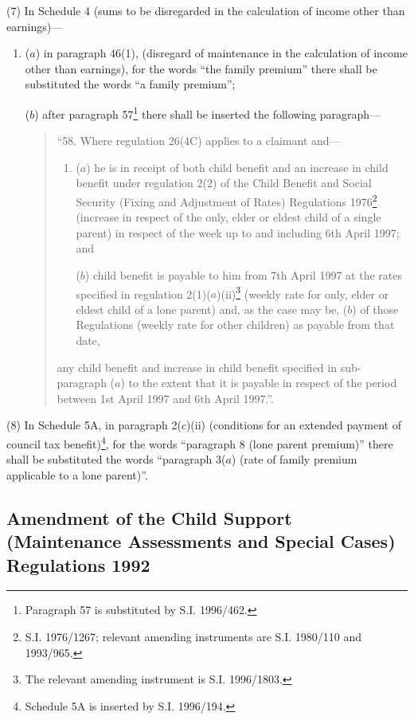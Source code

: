 \documentclass[a4paper]{article}
\begin{document}
(7)  In Schedule 4 (sums to be disregarded in the calculation of income other than earnings)—
\begin{enumerate}\item[]
($a$) in paragraph 46(1), (disregard of maintenance in the calculation of income other than earnings), for the words “the family premium” there shall be substituted the words “a family premium”;

($b$) after paragraph 57\footnote{\frenchspacing Paragraph 57 is substituted by S.I. 1996/462.} there shall be inserted the following paragraph—
\begin{quotation}
“58.  Where regulation 26(4C) applies to a claimant and—
\begin{enumerate}\item[]
($a$) he is in receipt of both child benefit and an increase in child benefit under regulation 2(2) of the Child Benefit and Social Security (Fixing and Adjustment of Rates) Regulations 1976\footnote{\frenchspacing S.I. 1976/1267; relevant amending instruments are S.I. 1980/110 and 1993/965.} (increase in respect of the only, elder or eldest child of a single parent) in respect of the week up to and including 6th April 1997; and

($b$) child benefit is payable to him from 7th April 1997 at the rates specified in regulation 2(1)($a$)(ii)\footnote{\frenchspacing The relevant amending instrument is S.I. 1996/1803.} (weekly rate for only, elder or eldest child of a lone parent) and, as the case may be, ($b$) of those Regulations (weekly rate for other children) as payable from that date,
\end{enumerate}
any child benefit and increase in child benefit specified in sub-paragraph ($a$) to the extent that it is payable in respect of the period between 1st April 1997 and 6th April 1997.”.
\end{quotation}
\end{enumerate}

(8) In Schedule 5A, in paragraph 2($c$)(ii)  (conditions for an extended payment of council tax benefit)\footnote{\frenchspacing Schedule 5A is inserted by S.I. 1996/194.}, for the words “paragraph 8 (lone parent premium)” there shall be substituted the words “paragraph 3($a$) (rate of family premium applicable to a lone parent)”.

\subsection[9. Amendment of the Child Support (Maintenance Assessments and Special Cases) Regulations 1992]{Amendment of the Child Support (Maintenance Assessments and Special Cases) Regulations 1992}
\end{document}
